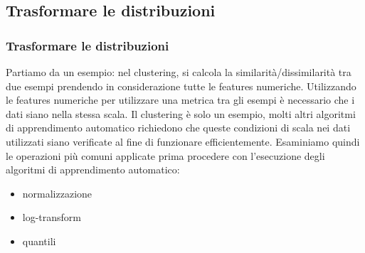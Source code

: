 \subsection[Trasformare le distribuzioni]{Trasformare le distribuzioni}

\begin{frame}
	
	\frametitle{{\color{GradientDescentDiagramOrange}Trasformare le distribuzioni}}
	
	
	
		Partiamo da un esempio: nel clustering, si calcola la similarità/dissimilarità tra due esempi prendendo in considerazione tutte le features numeriche.
		Utilizzando le features numeriche per utilizzare una metrica tra gli esempi è necessario che i dati siano nella stessa scala.
		\newlinedouble
		Il clustering è solo un esempio, molti altri algoritmi di apprendimento automatico richiedono che queste condizioni di scala nei dati utilizzati siano verificate al fine di funzionare efficientemente.
		\newlinedouble
		Esaminiamo quindi le operazioni più comuni applicate prima procedere con l'esecuzione degli algoritmi di apprendimento automatico:
		\begin{itemize}
			\item {\color{GradientDescentDiagramBlue}normalizzazione}
			\item {\color{GradientDescentDiagramRed}log-transform}
			\item {\color{GradientDescentDiagramGreen}quantili}
		\end{itemize}
	
\end{frame}





